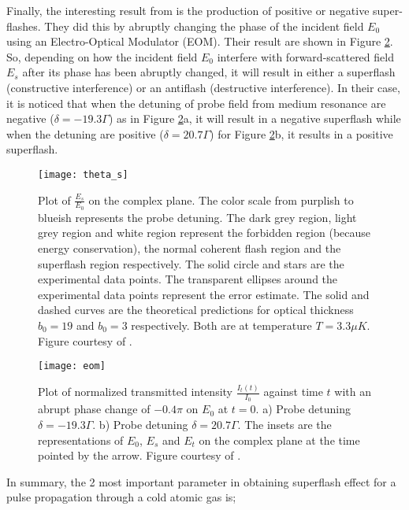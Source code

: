 Finally,  the interesting result from \cite{Kwong2014} is the production of positive or negative super-flashes. They did this by abruptly changing the phase of the incident field $E_{0}$ using an Electro-Optical Modulator (EOM). Their result are shown in Figure \ref{fig: eom}. So, depending on how the incident field $E_{0}$ interfere with forward-scattered field $E_{s}$ after its phase has been abruptly changed, it will result in either a superflash (constructive interference) or an antiflash (destructive interference). In their case, it is noticed that when the detuning of probe field from medium resonance are negative ($\delta = -19.3 \Gamma$) as in Figure \ref{fig: eom}a, it will result in a negative superflash while when the detuning are positive ($\delta = 20.7 \Gamma$) for Figure \ref{fig: eom}b, it results in a positive superflash.

\begin{figure}[h!]
    \centering
    \texttt{[image: theta\_s]}
    \caption{Plot of $\frac{E_{s}}{E_{0}}$ on the complex plane. The color scale from purplish to blueish represents the probe detuning. The dark grey region, light grey region and white region represent the forbidden region (because energy conservation), the normal coherent flash region and the superflash region respectively. The solid circle and stars are the experimental data points. The transparent ellipses around the experimental data points represent the error estimate. The solid and dashed curves are the theoretical predictions for optical thickness $b_{0} = 19$ and $b_{0} = 3$ respectively. Both are at temperature $T = 3.3\mu K$. Figure courtesy of \cite{Kwong2014}.}
    \label{fig: theta_s}
\end{figure}

\begin{figure}[h!]
    \centering
    \texttt{[image: eom]}
    \caption{Plot of normalized transmitted intensity $\frac{I_{t}(t)}{I_{0}}$ against time $t$ with an abrupt phase change of $-0.4\pi$ on $E_{0}$ at $t = 0$. a) Probe detuning $\delta = -19.3\Gamma$. b) Probe detuning $\delta = 20.7\Gamma$. The insets are the representations of $E_{0}$, $E_{s}$ and $E_{t}$ on the complex plane at the time pointed by the arrow. Figure courtesy of \protect{}.}
    \label{fig: eom}
\end{figure}

In summary, the 2 most important parameter in obtaining superflash effect for a pulse propagation through a cold atomic gas is;

